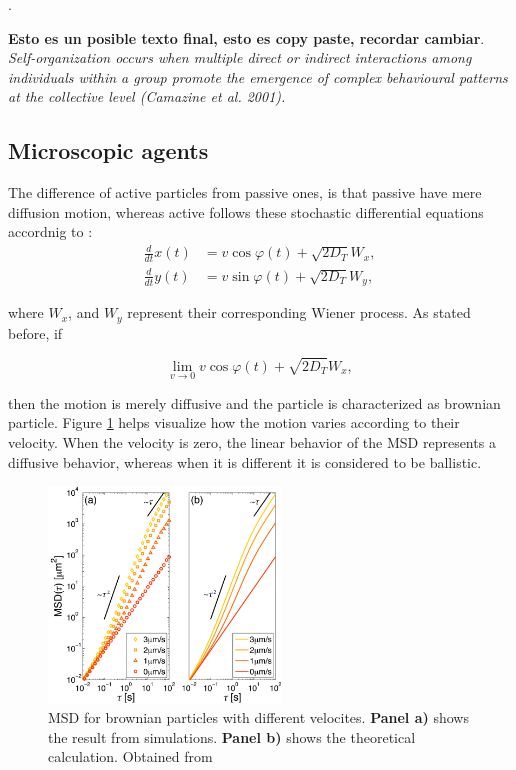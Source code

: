 \cite{couzin2002collective}.




\textbf{Esto es un posible texto final, esto es copy paste, recordar cambiar}. \textit{Self-organization occurs when multiple direct or indirect interactions among individuals within a group promote the emergence of complex behavioural patterns at the collective level (Camazine et al. 2001).}


\subsection{Microscopic agents}

The difference of active particles from passive ones, is that passive have mere diffusion motion, whereas active follows these stochastic differential equations accordnig to \cite{volpe2014simulation}:
\begin{align}
  \frac{d}{dt}x(t) &= v\cos{\varphi(t)} + \sqrt{2D_T}W_x,\\
  \frac{d}{dt}y(t) &= v\sin{\varphi(t)} + \sqrt{2D_T}W_y,
  \label{eq:activestochasticequation}
\end{align}

where $W_x$, and $W_y$ represent their corresponding Wiener process. As stated before, if 

\begin{equation}
  \lim_{v \to 0}  v\cos{\varphi(t)} + \sqrt{2D_T}W_x,
  \label{eq:limitofvelocity}
\end{equation}

then the motion is merely diffusive and the particle is characterized as brownian particle. Figure \ref{fig:msddifferentvelocities} helps visualize how  the motion varies according to their velocity. When the velocity is zero, the linear behavior of the MSD represents a diffusive behavior, whereas when it is different it is considered to be ballistic. 

\begin{figure}
  \begin{center}
    \includegraphics[width=0.55\textwidth]{figures/msddifferentvelocities.png}
  \end{center}
  \caption[MSD for passive and active brownian particles]{MSD for brownian particles with different velocites. \textbf{Panel a)} shows the result from simulations. \textbf{Panel b)} shows the theoretical calculation. Obtained from \cite{volpe2014simulation}}\label{fig:msddifferentvelocities}
\end{figure}


